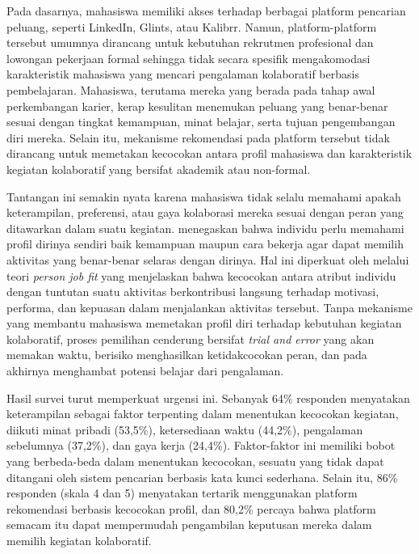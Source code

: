 Pada dasarnya, mahasiswa memiliki akses terhadap berbagai platform pencarian peluang, seperti LinkedIn, Glints, atau Kalibrr. Namun, platform-platform tersebut umumnya dirancang untuk kebutuhan rekrutmen profesional dan lowongan pekerjaan formal sehingga tidak secara spesifik mengakomodasi karakteristik mahasiswa yang mencari pengalaman kolaboratif berbasis pembelajaran. Mahasiswa, terutama mereka yang berada pada tahap awal perkembangan karier, kerap kesulitan menemukan peluang yang benar-benar sesuai dengan tingkat kemampuan, minat belajar, serta tujuan pengembangan diri mereka. Selain itu, mekanisme rekomendasi pada platform tersebut tidak dirancang untuk memetakan kecocokan antara profil mahasiswa dan karakteristik kegiatan kolaboratif yang bersifat akademik atau non-formal.

Tantangan ini semakin nyata karena mahasiswa tidak selalu memahami apakah keterampilan, preferensi, atau gaya kolaborasi mereka sesuai dengan peran yang ditawarkan dalam suatu kegiatan. \textcite{schon1987} menegaskan bahwa individu perlu memahami profil dirinya sendiri baik kemampuan maupun cara bekerja agar dapat memilih aktivitas yang benar-benar selaras dengan dirinya. Hal ini diperkuat oleh \textcite{kristofbrown2005} melalui teori \emph{person job fit} yang menjelaskan bahwa kecocokan antara atribut individu dengan tuntutan suatu aktivitas berkontribusi langsung terhadap motivasi, performa, dan kepuasan dalam menjalankan aktivitas tersebut. Tanpa mekanisme yang membantu mahasiswa memetakan profil diri terhadap kebutuhan kegiatan kolaboratif, proses pemilihan cenderung bersifat \emph{trial and error} yang akan memakan waktu, berisiko menghasilkan ketidakcocokan peran, dan pada akhirnya menghambat potensi belajar dari pengalaman.

Hasil survei turut memperkuat urgensi ini. Sebanyak 64\% responden menyatakan keterampilan sebagai faktor terpenting dalam menentukan kecocokan kegiatan, diikuti minat pribadi (53,5\%), ketersediaan waktu (44,2\%), pengalaman sebelumnya (37,2\%), dan gaya kerja (24,4\%). Faktor-faktor ini memiliki bobot yang berbeda-beda dalam menentukan kecocokan, sesuatu yang tidak dapat ditangani oleh sistem pencarian berbasis kata kunci sederhana. Selain itu, 86\% responden (skala 4 dan 5) menyatakan tertarik menggunakan platform rekomendasi berbasis kecocokan profil, dan 80,2\% percaya bahwa platform semacam itu dapat mempermudah pengambilan keputusan mereka dalam memilih kegiatan kolaboratif.


